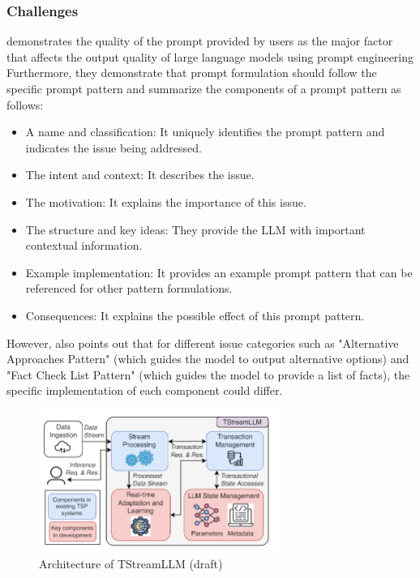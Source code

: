 \documentclass[runningheads]{llncs}
\begin{document}
\subsubsection{Challenges}
\noindent \newline
\cite{White23} demonstrates the quality of the prompt provided by users as the major factor that affects the output quality of large language models using prompt engineering
Furthermore, they demonstrate that prompt formulation should follow the specific prompt pattern and summarize the components of a prompt pattern as follows:
\begin{itemize}
  \item A name and classification: It uniquely identifies the prompt pattern and indicates the issue being addressed.
  \item The intent and context: It describes the issue.
  \item The motivation: It explains the importance of this issue.
  \item The structure and key ideas: They provide the LLM with important contextual information.
  \item Example implementation: It provides an example prompt pattern that can be referenced for other pattern formulations.
  \item Consequences: It explains the possible effect of this prompt pattern.
\end{itemize}
However, \cite{White23} also points out that for different issue categories such as "Alternative Approaches Pattern" (which guides the model to output alternative options) and "Fact Check List Pattern" 
(which guides the model to provide a list of facts), the specific implementation of each component could differ.

\begin{figure}[]
  \centering
  \includegraphics[width=0.7\textwidth]{TStreamLLM architecture.png}
  \caption{Architecture of TStreamLLM (draft) \cite{Zhang24}}
  \label{fig:TStreamLLM}
\end{figure}
\end{document}

